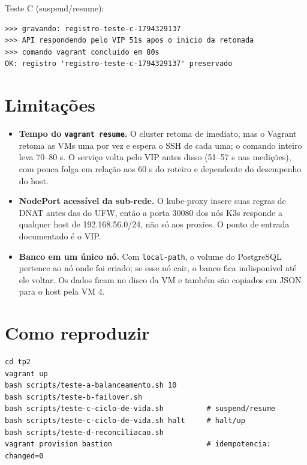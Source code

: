 \documentclass[11pt,a4paper]{article}
\begin{document}
Teste C (suspend/resume):
\begin{lstlisting}
>>> gravando: registro-teste-c-1794329137
>>> API respondendo pelo VIP 51s apos o inicio da retomada
>>> comando vagrant concluido em 80s
OK: registro 'registro-teste-c-1794329137' preservado
\end{lstlisting}

\section{Limitações}
\begin{itemize}
\item \textbf{Tempo do \texttt{vagrant resume}.} O cluster retoma de imediato, mas o
  Vagrant retoma as VMs uma por vez e espera o SSH de cada uma; o comando inteiro leva
  70--80 s. O serviço volta pelo VIP antes disso (51--57 s nas medições), com pouca folga
  em relação aos 60 s do roteiro e dependente do desempenho do host.
\item \textbf{NodePort acessível da sub-rede.} O kube-proxy insere suas regras de DNAT
  antes das do UFW, então a porta 30080 dos nós K3s responde a qualquer host de
  192.168.56.0/24, não só aos proxies. O ponto de entrada documentado é o VIP.
\item \textbf{Banco em um único nó.} Com \texttt{local-path}, o volume do PostgreSQL pertence
  ao nó onde foi criado; se esse nó cair, o banco fica indisponível até ele voltar. Os
  dados ficam no disco da VM e também são copiados em JSON para o host pela VM 4.
\end{itemize}

\section{Como reproduzir}
\begin{lstlisting}
cd tp2
vagrant up
bash scripts/teste-a-balanceamento.sh 10
bash scripts/teste-b-failover.sh
bash scripts/teste-c-ciclo-de-vida.sh          # suspend/resume
bash scripts/teste-c-ciclo-de-vida.sh halt     # halt/up
bash scripts/teste-d-reconciliacao.sh
vagrant provision bastion                      # idempotencia: changed=0
\end{lstlisting}
\end{document}
